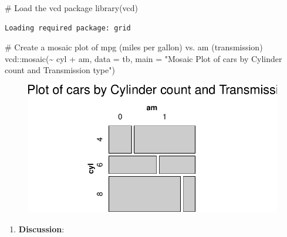 \documentclass[
  letterpaper,
  DIV=11,
  numbers=noendperiod]{scrreport}
\newenvironment{Shaded}{\begin{snugshade}}{\end{snugshade}}
\newcommand{\AttributeTok}[1]{\textcolor[rgb]{0.40,0.45,0.13}{#1}}
\newcommand{\CommentTok}[1]{\textcolor[rgb]{0.37,0.37,0.37}{#1}}
\newcommand{\FunctionTok}[1]{\textcolor[rgb]{0.28,0.35,0.67}{#1}}
\newcommand{\NormalTok}[1]{\textcolor[rgb]{0.00,0.23,0.31}{#1}}
\newcommand{\SpecialCharTok}[1]{\textcolor[rgb]{0.37,0.37,0.37}{#1}}
\newcommand{\StringTok}[1]{\textcolor[rgb]{0.13,0.47,0.30}{#1}}
\providecommand{\tightlist}{%
  \setlength{\itemsep}{0pt}\setlength{\parskip}{0pt}}\usepackage{longtable,booktabs,array}
\begin{document}
\begin{Shaded}
\begin{Highlighting}[]
\CommentTok{\# Load the vcd package}
\FunctionTok{library}\NormalTok{(vcd)}
\end{Highlighting}
\end{Shaded}

\begin{verbatim}
Loading required package: grid
\end{verbatim}

\begin{Shaded}
\begin{Highlighting}[]
\CommentTok{\# Create a mosaic plot of mpg (miles per gallon) vs. am (transmission)}
\NormalTok{vcd}\SpecialCharTok{::}\FunctionTok{mosaic}\NormalTok{(}\SpecialCharTok{\textasciitilde{}}\NormalTok{ cyl }\SpecialCharTok{+}\NormalTok{ am, }
       \AttributeTok{data =}\NormalTok{ tb, }
       \AttributeTok{main =} \StringTok{"Mosaic Plot of cars by Cylinder count and Transmission type"}\NormalTok{)}
\end{Highlighting}
\end{Shaded}

\begin{figure}[H]

{\centering \includegraphics{08CategoricalData02_files/figure-pdf/unnamed-chunk-26-1.pdf}

}

\end{figure}

\begin{enumerate}
\def\labelenumi{\arabic{enumi}.}
\setcounter{enumi}{6}
\tightlist
\item
  \textbf{Discussion}:
\end{enumerate}
\end{document}
